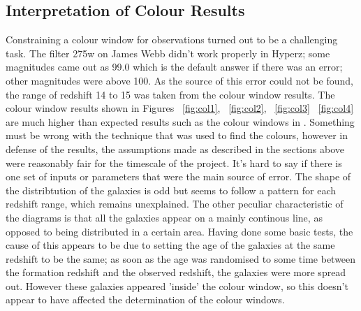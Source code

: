 	\subsection{Interpretation of Colour Results}
	\label{sub:Interp_Colour}
		Constraining a colour window for observations turned out to be a challenging task. The filter 275w on James Webb didn't work properly in Hyperz; some magnitudes came out as 99.0 which is the default answer if there was an error; other magnitudes were above 100. As the source of this error could not be found, the range of redshift 14 to 15 was taken from the colour window results. The colour window results  shown in Figures ~\ref{fig:col1}, ~\ref{fig:col2}, ~\ref{fig:col3}  ~\ref{fig:col4} are much higher than expected results such as the colour windows in \cite{lorenzoni2013constraining}. Something must be wrong with the technique that was used to find the colours, however in defense of the results, the assumptions made as described in the sections above were reasonably fair for the timescale of the project. It's hard to say if there is one set of inputs or parameters that were the main source of error.  The shape of the distribtution of the galaxies is odd but seems to follow a pattern for each redshift range, which remains unexplained. The other peculiar characteristic of the diagrams is that all the galaxies appear on a mainly continous line, as opposed to being distributed in a certain area. Having done some basic tests, the cause of this appears to be due to setting the age of the galaxies at the same redshift to be the same; as soon as the age was randomised to some time between the formation redshift and the observed redshift, the galaxies were more spread out. However these galaxies appeared 'inside' the colour window, so this doesn't appear to have affected the determination of the colour windows. 




	

